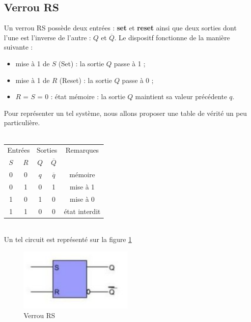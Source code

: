 \documentclass{book}
\theoremstyle{definition}
\theoremstyle{definition}
\begin{document}
\subsection{Verrou RS}
Un verrou RS possède deux entrées : \textbf{set} et \textbf{reset} ainsi que deux sorties dont l'une est l'inverse de l'autre : $Q$ et $\overline{Q}$. Le dispositf fonctionne de la manière suivante :
\begin{itemize}
    \item mise à 1 de $S$ (Set) : la sortie $Q$ passe à 1 ;
    \item mise à 1 de $R$ (Reset) : la sortie $Q$ passe à 0 ;
    \item $R$ = $S$ = 0 : état mémoire : la sortie $Q$ maintient sa valeur précédente $q$.
\end{itemize}
Pour représenter un tel système, nous allons proposer une table de vérité un peu particulière.
\\
\\
 \begin{tabular}{|c|c||c|c||c|}
    \hline
         \multicolumn{2}{|c||}{Entrées}& \multicolumn{2}{c||}{Sorties}&
         Remarques\\
        
         $S$ & $R$ & $Q$ & $\overline{Q}$ & \\
    \hline 
        0 & 0 & $q$ & $\overline{q}$ & mémoire \\
        0 & 1 & 0 & 1 & mise à 1 \\
        1 & 0 & 1 & 0 & mise à 0 \\
        1 & 1 & 0 & 0 & état interdit \\
    \hline
  \end{tabular}
\\

Un tel circuit est représenté sur la figure \ref{fig:basculeRS}

\begin{figure}
\includegraphics[width=0.5\textwidth]{media/SysLogiques/VerrouRS.png}
    \centering
    \caption{Verrou RS}
    \label{fig:basculeRS}
\end{figure}
\end{document}
